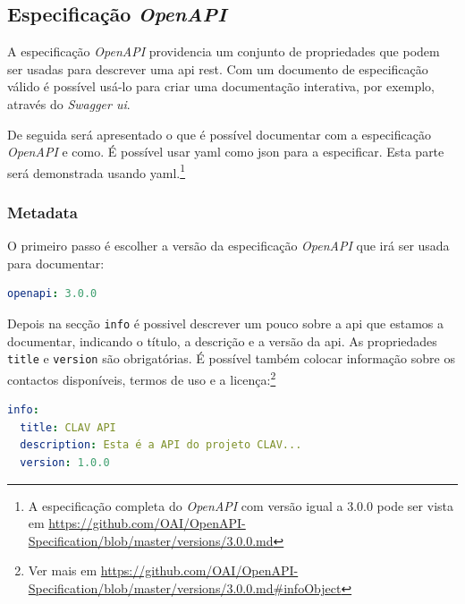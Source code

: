 \subsection{Especificação \textit{OpenAPI}}

A especificação \textit{OpenAPI} providencia um conjunto de propriedades que podem ser usadas para descrever uma \acrshort{api} \acrshort{rest}. Com um documento de especificação válido é possível usá-lo para criar uma documentação interativa, por exemplo, através do \textit{Swagger \acrshort{ui}}.

De seguida será apresentado o que é possível documentar com a especificação \textit{OpenAPI} e como. É possível usar \acrshort{yaml} como \acrshort{json} para a especificar. Esta parte será demonstrada usando \acrshort{yaml}.\footnote{A especificação completa do \textit{OpenAPI} com versão igual a 3.0.0 pode ser vista em \url{https://github.com/OAI/OpenAPI-Specification/blob/master/versions/3.0.0.md}}

\subsubsection{Metadata}
O primeiro passo é escolher a versão da especificação \textit{OpenAPI} que irá ser usada para documentar:
\begin{lstlisting}[language=yaml, caption=Exemplo de indicação da versão da especificação \textit{OpenAPI}]
openapi: 3.0.0
\end{lstlisting}

Depois na secção \texttt{info} é possivel descrever um pouco sobre a \acrshort{api} que estamos a documentar, indicando o título, a descrição e a versão da \acrshort{api}. As propriedades \texttt{title} e \texttt{version} são obrigatórias. É possível também colocar informação sobre os contactos disponíveis, termos de uso e a licença:\footnote{Ver mais em \url{https://github.com/OAI/OpenAPI-Specification/blob/master/versions/3.0.0.md\#infoObject}}
\begin{lstlisting}[language=yaml, caption={Exemplo de secção \texttt{info} indicando título, descrição e versão da \acrshort{api} na especificação \textit{OpenAPI}}]
info:
  title: CLAV API
  description: Esta é a API do projeto CLAV...
  version: 1.0.0
\end{lstlisting}

